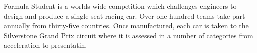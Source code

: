 Formula Student is a worlds wide competition which challenges engineers to design and produce a single-seat racing car. Over one-hundred teams take part annually from thirty-five countries. Once manufactured, each car is taken to the Silverstone Grand Prix circuit where it is assessed in a number of categories from acceleration to presentatin.
